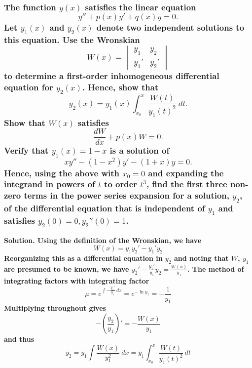 \documentclass{article}
\begin{document}
\hrulefill
\subsubsection*{The function $y(x)$ satisfies the linear equation
\begin{equation*}
    y''+p(x)y'+q(x)y=0.
\end{equation*}
Let $y_1(x)$ and $y_2(x)$ denote two independent solutions to this equation. Use the Wronskian
\begin{equation*}
    W(x) = \begin{vmatrix}
        y_1 & y_2 \\
        y_1' & y_2'
    \end{vmatrix}
\end{equation*}
to determine a first-order inhomogeneous differential equation for $y_2(x)$. Hence, show that 
\begin{equation*}
    y_2(x) = y_1(x)\int_{x_0}^{x} \frac{W(t)}{y_1(t)^2}\ dt.
\end{equation*}
Show that $W(x)$ satisfies
\begin{equation*}
    \frac{dW}{dx} + p(x)W = 0.
\end{equation*}
Verify that $y_1(x)=1-x$ is a solution of 
\begin{equation*}
    xy'' - (1-x^2)y' - (1+x)y = 0.
\end{equation*}
Hence, using the above with $x_0 = 0$ and expanding the integrand in powers of $t$ to order $t^3$, find the first three non-zero terms in the power series expansion for a solution, $y_2$, of the differential equation that is independent of $y_1$ and satisfies $y_2(0)=0, y_2''(0)=1$.
}
\bf Solution. \normalfont Using the definition of the Wronskian, we have
\begin{equation*}
    W(x) = y_1 y_2' - y_1' y_2
\end{equation*}
Reorganizing this as a differential equation in $y_2$ and noting that $W$, $y_1$ are presumed to be known, we have $y_2' - \frac{y_1'}{y_1} y_2 = \frac{W(x)}{y_1}$. The method of integrating factors with integrating factor
\begin{equation*}
    \mu = e^{\int -\frac{y_1'}{y_1}\ dx} = e^{- \ln y_1} = -\frac{1}{y_1}
\end{equation*}
Multiplying throughout gives 
\begin{equation*}
    -(\frac{y_2}{y_1})' = -\frac{W(x)}{y_1}
\end{equation*}
and thus 
\begin{equation*}
    y_2 = y_1 \int \frac{W(x)}{y_1^2} \ dx = y_1 \int_{x_0}^x \frac{W(t)}{y_1(t)^2}\ dt
\end{equation*}
\end{document}
